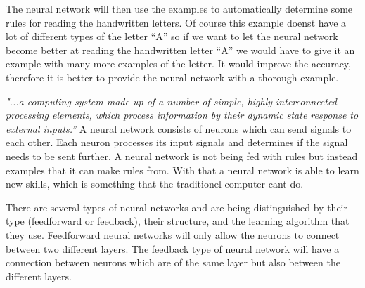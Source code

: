 The neural network will then use the examples to automatically determine some rules for reading the handwritten letters. Of course this example doenst have a lot of different types of the letter “A” so if we want to let the neural network become better at reading the handwritten letter “A” we would have to give it an example with many more examples of the letter. It would improve the accuracy, therefore it is better to provide the neural network with a thorough example.


\textit{"...a computing system made up of a number of simple, highly interconnected processing elements, which process information by their dynamic state response to external inputs.”}
A neural network consists of neurons which can send signals to each other. Each neuron processes its input signals and determines if the signal needs to be sent further. 
A neural network is not being fed with rules but instead examples that it can make rules from. With that a neural network is able to learn new skills, which is something that the traditionel computer cant do.

There are several types of neural networks and are being distinguished by their type (feedforward or feedback), their structure, and the learning algorithm that they use.
Feedforward neural networks will only allow the neurons to connect between two different layers. The feedback type of neural network will have a connection between neurons which are of the same layer but also between the different layers.

